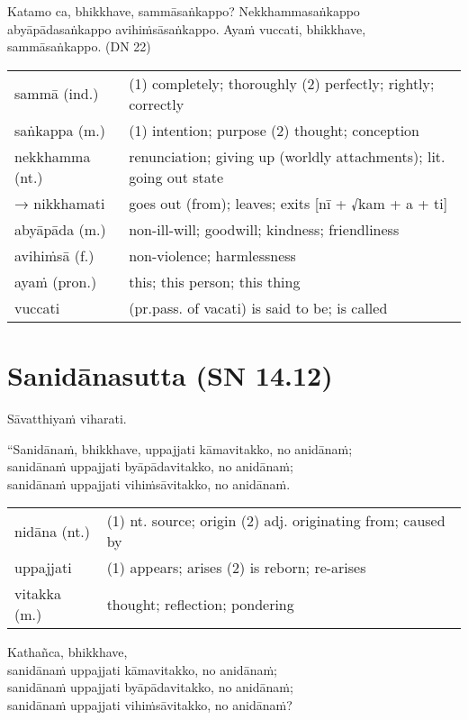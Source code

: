 \documentclass[11pt,oneside]{memoir}
\begin{document}
Katamo ca, bhikkhave, sammāsaṅkappo? Nekkhammasaṅkappo abyāpādasaṅkappo
avihiṁsāsaṅkappo. Ayaṁ vuccati, bhikkhave, sammāsaṅkappo. (DN 22)

\begin{longtable}{L{\colOne} L{\colTwo}}
sammā (ind.) & (1) completely; thoroughly (2) perfectly; rightly; correctly\\[0pt]
saṅkappa (m.) & (1) intention; purpose (2) thought; conception\\[0pt]
nekkhamma (nt.) & renunciation; giving up (worldly attachments); lit. going out state\\[0pt]
→ nikkhamati & goes out (from); leaves; exits [nī + √kam + a + ti]\\[0pt]
abyāpāda (m.) & non-ill-will; goodwill; kindness; friendliness\\[0pt]
avihiṁsā (f.) & non-violence; harmlessness\\[0pt]
ayaṁ (pron.) & this; this person; this thing\\[0pt]
vuccati & (pr.pass. of vacati) is said to be; is called\\[0pt]
\end{longtable}

\section{Sanidānasutta (SN 14.12)}
\label{sec:orgf44e2c9}

Sāvatthiyaṁ viharati.

“Sanidānaṁ, bhikkhave, uppajjati kāmavitakko, no anidānaṁ; \\[0pt]
sanidānaṁ uppajjati byāpādavitakko, no anidānaṁ; \\[0pt]
sanidānaṁ uppajjati vihiṁsāvitakko, no anidānaṁ.

\begin{longtable}{L{\colOne} L{\colTwo}}
nidāna (nt.) & (1) nt. source; origin (2) adj. originating from; caused by\\[0pt]
uppajjati & (1) appears; arises (2) is reborn; re-arises\\[0pt]
vitakka (m.) & thought; reflection; pondering\\[0pt]
\end{longtable}

Kathañca, bhikkhave, \\[0pt]
sanidānaṁ uppajjati kāmavitakko, no anidānaṁ; \\[0pt]
sanidānaṁ uppajjati byāpādavitakko, no anidānaṁ; \\[0pt]
sanidānaṁ uppajjati vihiṁsāvitakko, no anidānaṁ?
\end{document}
